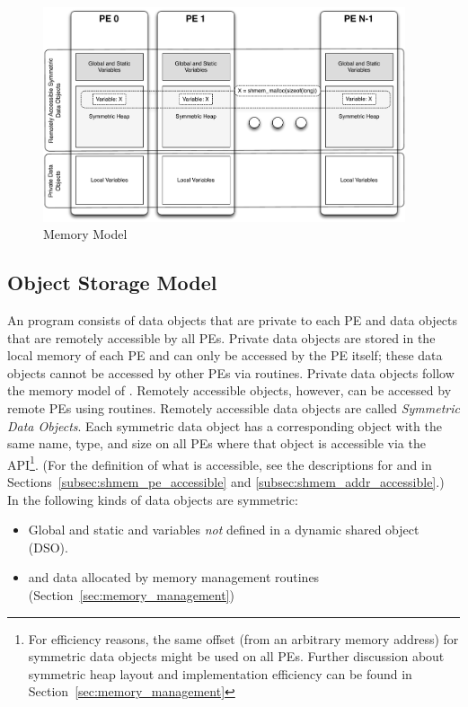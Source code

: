 \begin{figure}[h]
\includegraphics[width=0.95\textwidth]{figures/mem_model}
\caption{\openshmem Memory Model}
\label{fig:mem_model}
\end{figure}

\subsection{Object Storage Model}

An \openshmem program consists of data objects that are private to each \ac{PE}
and data  objects that are remotely accessible by all \acp{PE}. Private data
objects are stored in the local memory of each \ac{PE} and can only be accessed
by the \ac{PE} itself; these data objects cannot be accessed by other \acp{PE}
via \openshmem routines. Private data objects follow the memory model of
\Cstd. Remotely accessible objects, however, can be accessed by
remote \acp{PE} using \openshmem routines.  Remotely accessible data objects are
called \emph{Symmetric Data Objects}.  Each symmetric data object has a
corresponding object with the same name, type, and size on all \acp{PE} where that object is
accessible via the \openshmem \ac{API}\footnote{For efficiency reasons,
the same offset (from an arbitrary memory address) for symmetric data
objects might be used on all \acp{PE}. Further discussion about symmetric heap
layout and implementation efficiency can be found in Section~\ref{sec:memory_management}}.
(For the definition of what is accessible, see the
descriptions for  and 
in Sections~\ref{subsec:shmem_pe_accessible} and
\ref{subsec:shmem_addr_accessible}.) In \openshmem the following kinds of
data objects are symmetric:
%
\begin{itemize}
\item Global and static \Cstd and \Cpp variables \emph{not} defined in
  a dynamic shared object (DSO).
\item \Cstd and \Cpp data allocated by \openshmem memory management routines
  (Section~\ref{sec:memory_management})
\end{itemize}

